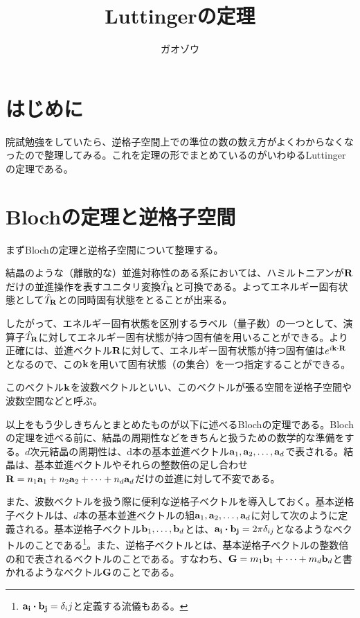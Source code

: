 \documentclass[uplatex,dvipdfmx]{jsarticle}
\title{Luttingerの定理}
\author{ガオゾウ}
\begin{document}
\maketitle

\section{はじめに}
    院試勉強をしていたら、逆格子空間上での準位の数の数え方がよくわからなくなったので整理してみる。これを定理の形でまとめているのがいわゆるLuttingerの定理である。

\section{Blochの定理と逆格子空間}
	まずBlochの定理と逆格子空間について整理する。
	
	結晶のような（離散的な）並進対称性のある系においては、ハミルトニアンが$\vb{R}$だけの並進操作を表すユニタリ変換$\hat{T}_{\vb{R}}$と可換である。よってエネルギー固有状態として$\hat{T}_{\vb{R}}$との同時固有状態をとることが出来る。

	したがって、エネルギー固有状態を区別するラベル（量子数）の一つとして、演算子$\hat{T}_{\vb{R}}$に対してエネルギー固有状態が持つ固有値を用いることができる。より正確には、並進ベクトル$\vb{R}$に対して、エネルギー固有状態が持つ固有値は$e^{i\vb{k}\vdot\vb{R}}$となるので、この$\vb{k}$を用いて固有状態（の集合）を一つ指定することができる。

	このベクトル$\vb{k}$を波数ベクトルといい、このベクトルが張る空間を逆格子空間や波数空間などと呼ぶ。

	以上をもう少しきちんとまとめたものが以下に述べるBlochの定理である。Blochの定理を述べる前に、結晶の周期性などをきちんと扱うための数学的な準備をする。$d$次元結晶の周期性は、d本の基本並進ベクトル$\vb{a}_1, \vb{a}_2, \dots , \vb{a}_d$で表される。結晶は、基本並進ベクトルやそれらの整数倍の足し合わせ$\vb{R} = n_1\vb{a}_1 + n_2\vb{a}_2 + \dots + n_d\vb{a}_d$だけの並進に対して不変である。
	
	また、波数ベクトルを扱う際に便利な逆格子ベクトルを導入しておく。基本逆格子ベクトルは、$d$本の基本並進ベクトルの組$\vb{a}_1, \vb{a}_2, \dots , \vb{a}_d$に対して次のように定義される。基本逆格子ベクトル$\vb{b}_1, \dots, \vb{b}_d$とは、$\vb{a_i}\vdot\vb{b_j} = 2\pi\delta_{ij}$となるようなベクトルのことである\footnote{$\vb{a_i}\vdot\vb{b_j} = \delta_ij$と定義する流儀もある。}。また、逆格子ベクトルとは、基本逆格子ベクトルの整数倍の和で表されるベクトルのことである。すなわち、$\vb{G} = m_1\vb{b}_1 + \dots + m_d\vb{b}_d$と書かれるようなベクトル$\vb{G}$のことである。
\end{document}
